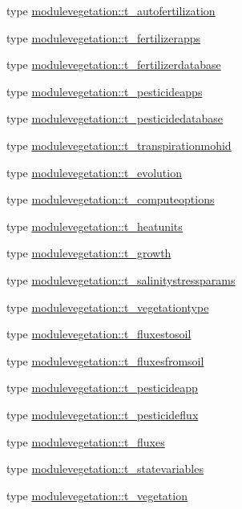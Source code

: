 \begin{DoxyCompactItemize}
\item 
type \mbox{\hyperlink{structmodulevegetation_1_1t__autofertilization}{modulevegetation\+::t\+\_\+autofertilization}}
\item 
type \mbox{\hyperlink{structmodulevegetation_1_1t__fertilizerapps}{modulevegetation\+::t\+\_\+fertilizerapps}}
\item 
type \mbox{\hyperlink{structmodulevegetation_1_1t__fertilizerdatabase}{modulevegetation\+::t\+\_\+fertilizerdatabase}}
\item 
type \mbox{\hyperlink{structmodulevegetation_1_1t__pesticideapps}{modulevegetation\+::t\+\_\+pesticideapps}}
\item 
type \mbox{\hyperlink{structmodulevegetation_1_1t__pesticidedatabase}{modulevegetation\+::t\+\_\+pesticidedatabase}}
\item 
type \mbox{\hyperlink{structmodulevegetation_1_1t__transpirationmohid}{modulevegetation\+::t\+\_\+transpirationmohid}}
\item 
type \mbox{\hyperlink{structmodulevegetation_1_1t__evolution}{modulevegetation\+::t\+\_\+evolution}}
\item 
type \mbox{\hyperlink{structmodulevegetation_1_1t__computeoptions}{modulevegetation\+::t\+\_\+computeoptions}}
\item 
type \mbox{\hyperlink{structmodulevegetation_1_1t__heatunits}{modulevegetation\+::t\+\_\+heatunits}}
\item 
type \mbox{\hyperlink{structmodulevegetation_1_1t__growth}{modulevegetation\+::t\+\_\+growth}}
\item 
type \mbox{\hyperlink{structmodulevegetation_1_1t__salinitystressparams}{modulevegetation\+::t\+\_\+salinitystressparams}}
\item 
type \mbox{\hyperlink{structmodulevegetation_1_1t__vegetationtype}{modulevegetation\+::t\+\_\+vegetationtype}}
\item 
type \mbox{\hyperlink{structmodulevegetation_1_1t__fluxestosoil}{modulevegetation\+::t\+\_\+fluxestosoil}}
\item 
type \mbox{\hyperlink{structmodulevegetation_1_1t__fluxesfromsoil}{modulevegetation\+::t\+\_\+fluxesfromsoil}}
\item 
type \mbox{\hyperlink{structmodulevegetation_1_1t__pesticideapp}{modulevegetation\+::t\+\_\+pesticideapp}}
\item 
type \mbox{\hyperlink{structmodulevegetation_1_1t__pesticideflux}{modulevegetation\+::t\+\_\+pesticideflux}}
\item 
type \mbox{\hyperlink{structmodulevegetation_1_1t__fluxes}{modulevegetation\+::t\+\_\+fluxes}}
\item 
type \mbox{\hyperlink{structmodulevegetation_1_1t__statevariables}{modulevegetation\+::t\+\_\+statevariables}}
\item 
type \mbox{\hyperlink{structmodulevegetation_1_1t__vegetation}{modulevegetation\+::t\+\_\+vegetation}}
\end{DoxyCompactItemize}
